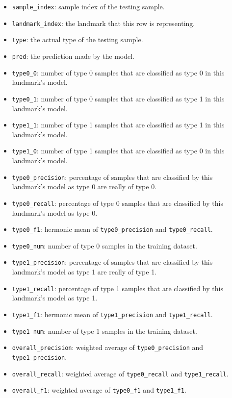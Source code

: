 \documentclass[10pt,letterpaper]{article}
\providecommand{\tightlist}{%
  \setlength{\itemsep}{0pt}\setlength{\parskip}{0pt}}
\begin{document}
\begin{itemize}
\tightlist
\item
  \texttt{sample\_index}: sample index of the testing sample.
\item
  \texttt{landmark\_index}: the landmark that this row is representing.
\item
  \texttt{type}: the actual type of the testing sample.
\item
  \texttt{pred}: the prediction made by the model.
\item
  \texttt{type0\_0}: number of type 0 samples that are classified as
  type 0 in this landmark's model.
\item
  \texttt{type0\_1}: number of type 0 samples that are classified as
  type 1 in this landmark's model.
\item
  \texttt{type1\_1}: number of type 1 samples that are classified as
  type 1 in this landmark's model.
\item
  \texttt{type1\_0}: number of type 1 samples that are classified as
  type 0 in this landmark's model.
\item
  \texttt{type0\_precision}: percentage of samples that are classified
  by this landmark's model as type 0 are really of type 0.
\item
  \texttt{type0\_recall}: percentage of type 0 samples that are
  classified by this landmark's model as type 0.
\item
  \texttt{type0\_f1}: hermonic mean of \texttt{type0\_precision} and
  \texttt{type0\_recall}.
\item
  \texttt{type0\_num}: number of type 0 samples in the training dataset.
\item
  \texttt{type1\_precision}: percentage of samples that are classified
  by this landmark's model as type 1 are really of type 1.
\item
  \texttt{type1\_recall}: percentage of type 1 samples that are
  classified by this landmark's model as type 1.
\item
  \texttt{type1\_f1}: hermonic mean of \texttt{type1\_precision} and
  \texttt{type1\_recall}.
\item
  \texttt{type1\_num}: number of type 1 samples in the training dataset.
\item
  \texttt{overall\_precision}: weighted average of
  \texttt{type0\_precision} and \texttt{type1\_precision}.
\item
  \texttt{overall\_recall}: weighted average of \texttt{type0\_recall}
  and \texttt{type1\_recall}.
\item
  \texttt{overall\_f1}: weighted average of \texttt{type0\_f1} and
  \texttt{type1\_f1}.
\end{itemize}
\end{document}
